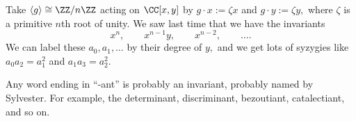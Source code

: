 \begin{example}
	Take $\langle g\rangle\cong\ZZ/n\ZZ$ acting on $\CC[x,y]$ by $g\cdot x:=\zeta x$ and $g\cdot y:=\zeta y,$ where $\zeta$ is a primitive $n$th root of unity. We saw last time that we have the invariants
	\[x^n,\qquad x^{n-1}y,\qquad x^{n-2},\qquad\ldots.\]
	We can label these $a_0,a_1,\ldots$ by their degree of $y,$ and we get lots of syzygies like $a_0a_2=a_1^2$ and $a_1a_3=a_2^2.$
\end{example}
\begin{remark}
	Any word ending in ``-ant'' is probably an invariant, probably named by Sylvester. For example, the determinant, discriminant, bezoutiant, catalectiant, and so on.
\end{remark}